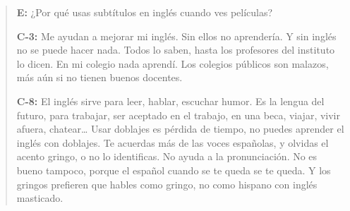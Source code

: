 \documentclass[spanish]{textolivre}
\newenvironment{MyQuote}{%
    \begin{myQuoteEnumerate}[resume=*,series=MyQuoteSeries]%
    \item \begin{quote}%
}{%
    \end{quote}%
    \end{myQuoteEnumerate}%
}%
\begin{document}
\begin{MyQuote}\label{myquote01}
\textbf{E:} ¿Por qué usas subtítulos en inglés cuando ves películas?

\textbf{C-3:} Me ayudan a mejorar mi inglés. Sin ellos no aprendería. Y sin inglés no se puede hacer nada. Todos lo saben, hasta los profesores del instituto lo dicen. En mi colegio nada aprendí. Los colegios públicos son malazos, más aún si no tienen buenos docentes.

\textbf{C-8:} El inglés sirve para leer, hablar, escuchar humor. Es la lengua del futuro, para trabajar, ser aceptado en el trabajo, en una beca, viajar, vivir afuera, chatear… Usar doblajes es pérdida de tiempo, no puedes aprender el inglés con doblajes. Te acuerdas más de las voces españolas, y olvidas el acento gringo, o no lo identificas. No ayuda a la pronunciación. No es bueno tampoco, porque el español cuando se te queda se te queda. Y los gringos prefieren que hables como gringo, no como hispano con inglés masticado.
\end{MyQuote}
\end{document}

